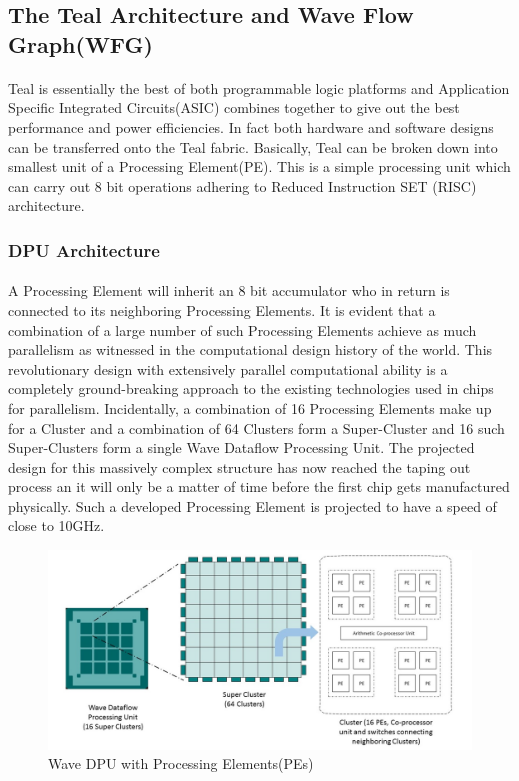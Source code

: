
\newpage
\subsection{The Teal Architecture and Wave Flow Graph(WFG)}
\paragraph{}
Teal is essentially the best of both programmable logic platforms and Application Specific Integrated Circuits(ASIC) combines together to give out the best performance and power efficiencies. In fact both hardware and software designs can be transferred onto the Teal fabric. Basically, Teal can be broken down into smallest unit of a Processing Element(PE). This is a simple processing unit which can carry out 8 bit operations adhering to Reduced Instruction SET (RISC) architecture.

\subsubsection{DPU Architecture}
\paragraph{}
A Processing Element will inherit an 8 bit accumulator who in return is connected to its neighboring Processing Elements. It is evident that a combination of a large number of such Processing Elements achieve as much parallelism as witnessed in the computational design history of the world. This revolutionary design with extensively parallel computational ability is a completely ground-breaking approach to the existing technologies used in chips for parallelism. Incidentally, a combination of 16 Processing Elements make up for a Cluster and a combination of 64 Clusters form a Super-Cluster and 16 such Super-Clusters form a single Wave Dataflow Processing Unit. The projected design for this massively complex structure has now reached the taping out process an it will only be a matter of time before the first chip gets manufactured physically. Such a developed Processing Element is projected to have a speed of close to 10GHz.

\begin{figure}[h]
    \centering
    \includegraphics[trim=0cm 0cm 0cm 0cm, clip=true,scale=0.5]{figures/dpu_struct.jpg}
    \caption{Wave DPU with Processing Elements(PEs)\label{Fig:dpustruct}}\vspace{-4mm}
    \end{figure}

